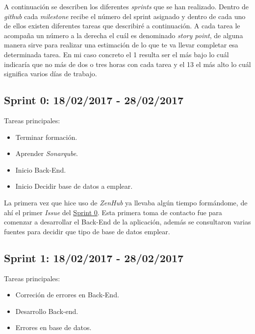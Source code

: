 A continuación se describen los diferentes \emph{sprints} que se han
realizado. Dentro de \emph{github} cada \emph{milestone} recibe el número del sprint asignado y dentro de cada uno de ellos existen diferentes tareas que describiré a continuación. A cada tarea le acompaña un número a la derecha el cuál es denominado \emph{story point}, de alguna manera sirve para realizar una estimación de lo que te va llevar completar esa determinada tarea. En mi caso concreto el 1 resulta ser el más bajo lo cuál indicaría que no más de dos o tres horas con cada tarea y el 13 el más alto lo cuál significa varios días de trabajo.


\subsection{Sprint 0: 18/02/2017 - 28/02/2017}\label{sprint0}

Tareas principales:

\begin{itemize}
	\item Terminar formación.
	\item Aprender \emph{Sonarqube}.
	\item Inicio Back-End.
    \item Inicio Decidir base de datos a emplear.
\end{itemize}


La primera vez que hice uso de \emph{ZenHub} ya llevaba algún tiempo formándome, de ahí el primer \emph{Issue} del \underline{Sprint 0}. Esta primera toma de contacto fue para comenzar a desarrollar el Back-End de la aplicación, además se consultaron varias fuentes para decidir que tipo de base de datos emplear.

\subsection{Sprint 1: 18/02/2017 - 28/02/2017}\label{sprint1}

Tareas principales:

\begin{itemize}
	\item Correción de errores en Back-End.
	\item Desarrollo Back-end.
	\item Errores en base de datos.
\end{itemize}


